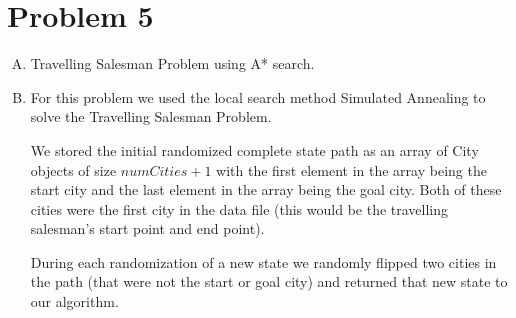 \documentclass[10pt,a4paper]{article}
\begin{document}
	\section*{Problem 5}
	\begin{enumerate}[A.]
		
		\item
		
		Travelling Salesman Problem using A* search.
		
		\item 
		
		For this problem we used the local search method Simulated Annealing to solve the Travelling Salesman Problem.
		
		We stored the initial randomized complete state path as an array of City objects of size $\textit{numCities} + 1$ with the first element in the array being the start city and the last element in the array being the goal city. Both of these cities were the first city in the data file (this would be the travelling salesman's start point and end point). 
		
		During each randomization of a new state we randomly flipped two cities in the path (that were not the start or goal city) and returned that new state to our algorithm.
		
	\end{enumerate}
	
\end{document}
